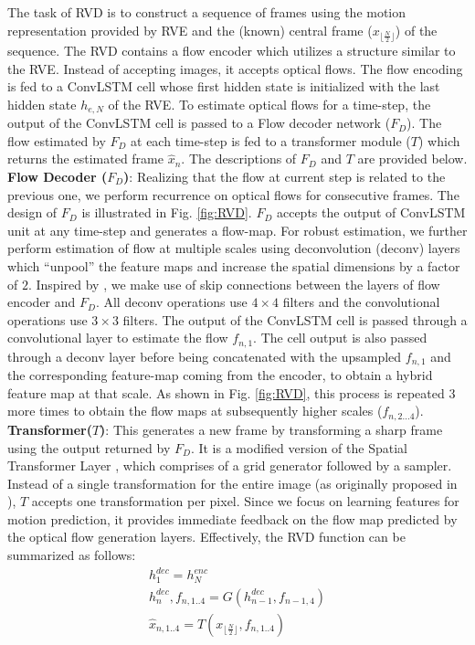 \documentclass[10pt,twocolumn,letterpaper]{article}
\begin{document}
The task of RVD is to construct a sequence of frames using the motion representation provided by RVE and the (known) central frame ($x_{\lfloor\frac{N}{2}\rfloor}$) of the sequence. The RVD contains a flow encoder which utilizes a structure similar to the RVE. Instead of accepting images, it accepts optical flows. The flow encoding is fed to a ConvLSTM cell whose first hidden state is initialized with the last hidden state $h_{e,N}$ of the RVE. To estimate optical flows for a time-step, the output of the ConvLSTM cell is passed to a Flow decoder network ($F_D$). The flow estimated by $F_D$ at each time-step is fed to a transformer module ($T$) which returns the estimated frame $\hat{x}_{n}$. The descriptions of $F_D$ and $T$ are provided below.
\\
\textbf{Flow Decoder ($F_D$)}:
Realizing that the flow at current step is related to the previous one, 
we perform recurrence on optical flows for consecutive frames. The design of $F_D$ is illustrated in Fig. \ref{fig:RVD}. 
$F_D$ accepts the output of ConvLSTM unit at any time-step and generates a flow-map. For robust estimation, we further perform estimation of flow at multiple scales using deconvolution (deconv) layers which ``unpool'' the feature maps and increase the spatial dimensions by a factor of $2$. Inspired by \cite{ronneberger2015u}, we make use of skip connections between the layers of flow encoder and $F_D$.
All deconv operations use $ 4\times 4$ filters and the convolutional operations use $3\times3$ filters. The output of the ConvLSTM cell is passed through a convolutional layer to estimate the flow $f_{n,1}$. The cell output is also passed through a deconv layer before being concatenated with the upsampled $f_{n,1}$ and the corresponding feature-map coming from the encoder, to obtain a hybrid feature map at that scale. As shown in Fig. \ref{fig:RVD}, this process is repeated $3$ more times to obtain the flow maps at subsequently higher scales ($f_{n,2...4}$).
\\
\textbf{Transformer($T$)}: This generates a new frame by transforming a sharp frame using the output returned by $F_D$. It is a modified version of the Spatial Transformer Layer \cite{jaderberg2015spatial}, which comprises of a grid generator followed by a sampler. Instead of a single transformation for the entire image (as originally proposed in \cite{jaderberg2015spatial}), $T$ accepts one transformation per pixel. Since we focus on learning features for motion prediction, it provides immediate feedback on the flow map predicted by the optical flow generation layers. Effectively, the RVD function can be summarized as follows:
\vspace{-1mm}
\begin{eqnarray}
h^{dec}_1 = h^{enc}_N \\
h^{dec}_n,f_{n,1..4} = G(h^{dec}_{n-1},f_{n-1,4})\\
\hat{x}_{n,1..4} = T(x_{\lfloor\frac{N}{2}\rfloor},f_{n,1..4})
\end{eqnarray}
\end{document}
